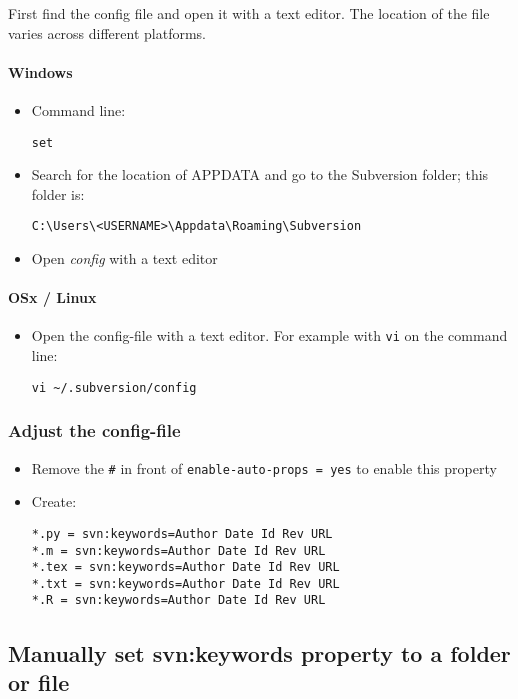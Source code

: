 First find the config file and open it with a text editor.
The location of the file varies across different platforms.
\paragraph*{Windows}
\begin{itemize}
\item Command line:
\begin{verbatim}
set
\end{verbatim}
\item Search for the location of APPDATA and go to the Subversion folder; this folder is:
\begin{verbatim}
C:\Users\<USERNAME>\Appdata\Roaming\Subversion
\end{verbatim}
\item Open \emph{config} with a text editor
\end{itemize}

\paragraph*{OSx / Linux}
\begin{itemize}
\item Open the config-file with a text editor. For example with \verb!vi! on the command line:
\begin{verbatim}
vi ~/.subversion/config
\end{verbatim}
\end{itemize}

\subsubsection{Adjust the config-file}
\begin{itemize} 
\item Remove the \verb!#! in front of \verb!enable-auto-props = yes! to enable this property
\item Create:
\begin{verbatim}
*.py = svn:keywords=Author Date Id Rev URL
*.m = svn:keywords=Author Date Id Rev URL
*.tex = svn:keywords=Author Date Id Rev URL
*.txt = svn:keywords=Author Date Id Rev URL
*.R = svn:keywords=Author Date Id Rev URL
\end{verbatim}
\end{itemize}
\subsection{Manually set svn:keywords property to a folder or file}
\label{sec:svn_man_props}
